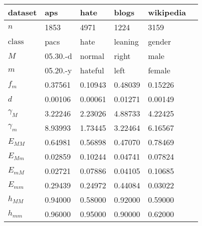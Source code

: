 \begin{tabular}{llllll}
\toprule
dataset &          aps &     hate   &  blogs   & wikipedia \\
\midrule
$n$     &         1853 &     4971    &   1224  & 3159   \\
$\text{class}$ &  pacs &     hate    & leaning & gender \\
$M$        &  05.30.-d &     normal  &  right  & male    \\
$m$        &  05.20.-y &     hateful &  left   & female  \\
$f_m$      &   0.37561 &     0.10943 & 0.48039 & 0.15226 \\
$d$        &   0.00106 &     0.00061 & 0.01271 & 0.00149 \\
$\gamma_M$ &   3.22246 &     2.23026 & 4.88733 & 4.22425 \\
$\gamma_m$ &   8.93993 &     1.73445 & 3.22464 & 6.16567 \\
$E_{MM}$   &   0.64981 &     0.56898 & 0.47070 & 0.78469 \\
$E_{Mm}$   &   0.02859 &     0.10244 & 0.04741 & 0.07824 \\
$E_{mM}$   &   0.02721 &     0.07886 & 0.04105 & 0.10685 \\
$E_{mm}$   &   0.29439 &     0.24972 & 0.44084 & 0.03022 \\
$h_{MM}$   &   0.94000 &     0.58000 & 0.92000 & 0.59000 \\
$h_{mm}$   &   0.96000 &     0.95000 & 0.90000 & 0.62000 \\
\bottomrule
\end{tabular}